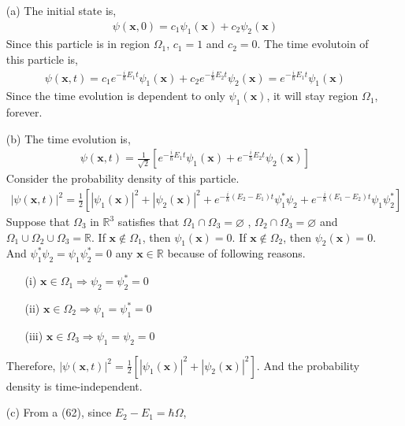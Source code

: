 \documentclass[floatfix,nofootinbib,superscriptaddress,fleqn]{revtex4}
\begin{document}
\begin{itemize}
\item[(a)] The initial state is,
  \begin{align}
    \psi(\bm{x},0) = c_1\psi_1(\bm{x})+c_2\psi_2(\bm{x})
  \end{align} 
  Since this particle is in region $\Omega_1$, $c_1=1$ and $c_2=0$. 
  The time evolutoin of this particle is,
  \begin{align}
    \psi(\bm{x},t) = c_1e^{-\frac{i}{\hbar}E_1t}\psi_1(\bm{x})
    +c_2e^{-\frac{i}{\hbar}E_2t}\psi_2(\bm{x}) 
    = e^{-\frac{i}{\hbar}E_1t}\psi_1(\bm{x})
  \end{align}
  Since the time evolution is dependent to only $\psi_1(\bm{x})$, 
  it will stay region $\Omega_1$, 
  forever.
\item[(b)]
  The time evolution is,
  \begin{align}
    \psi(\bm{x},t) = \frac{1}{\sqrt{2}}\left[
      e^{-\frac{i}{\hbar}E_1t}\psi_1(\bm{x})
    +e^{-\frac{i}{\hbar}E_2t}\psi_2(\bm{x})\right]
  \end{align}
  Consider the probability density of this particle.
  \begin{align}
    |\psi(\bm{x},t)|^2 = \frac{1}{2}\left[|\psi_1(\bm{x})|^2 
    +|\psi_2(\bm{x})|^2
    +e^{-\frac{i}{\hbar}(E_2-E_1)t}\psi_1^*\psi_2
    +e^{-\frac{i}{\hbar}(E_1-E_2)t}\psi_1\psi_2^*\right]
  \end{align}
  Suppose that $\Omega_3$ in $\mathbb{R}^3 $ satisfies that 
  $\Omega_1 \cap \Omega_3 = \varnothing$ , 
  $\Omega_2 \cap \Omega_3 = \varnothing$ 
  and $\Omega_1\cup \Omega_2\cup \Omega_3 = \mathbb{R}$.
  If $\bm{x}\notin\Omega_1$, then $\psi_1(\bm{x})=0$. 
  If $\bm{x}\notin\Omega_2$, then $\psi_2(\bm{x})=0$. 
  And $\psi_1^*\psi_2=\psi_1\psi_2^*=0$ any $\bm{x}\in \mathbb{R}$ 
  because of following reasons.
  \begin{itemize}
    \item[(i)] $\bm{x}\in\Omega_1 \Longrightarrow \psi_2=\psi^*_2=0$
    \item[(ii)] $\bm{x}\in\Omega_2 \Longrightarrow \psi_1=\psi^*_1=0$
    \item[(iii)] $\bm{x}\in\Omega_3 \Longrightarrow \psi_1=\psi_2=0$
  \end{itemize}
  Therefore, $|\psi(\bm{x},t)|^2=\frac{1}{2}\left[|\psi_1(\bm{x})|^2
  +|\psi_2(\bm{x})|^2 \right]$. 
  And the probability density is time-independent.
\item[(c)] From a (62), since $E_2-E_1=\hbar \Omega$,
  \begin{align}

\end{align}
\end{itemize}
\end{document}
